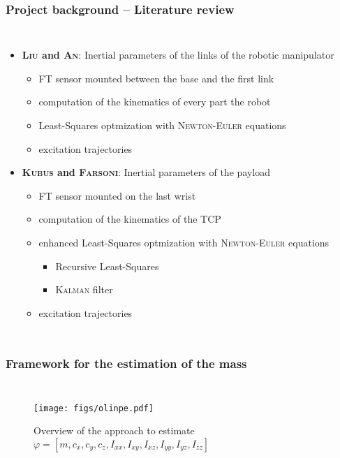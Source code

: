 \documentclass[aspectratio=1610]{beamer}
\begin{document}
\begin{frame}
\frametitle{Project background – Literature review}
\begin{columns}
\column{37em}
\begin{itemize}\itemsep1em
  \justifying
  \item \textbf{\textcolor{TextGreen}{\textsc{Liu} and \textsc{An}}}: Inertial parameters of the links of the robotic manipulator
  \begin{itemize}
    \item \textcolor{Ocean}{FT sensor} mounted between the base and the first link \textcolor{darkred}{\XSolidBrush}
    \item computation of the \textcolor{Ocean}{kinematics} of every part the robot
    \item \textcolor{Ocean}{Least-Squares} optmization with \textcolor{Ocean}{\textsc{Newton-Euler} equations}
    \item \textcolor{Ocean}{excitation trajectories} \textcolor{darkred}{\XSolidBrush}
  \end{itemize}
  \item \textbf{\textcolor{TextGreen}{\textsc{Kubus} and \textsc{Farsoni}}}: Inertial parameters of the payload
  \begin{itemize}
    \item \textcolor{Ocean}{FT sensor} mounted on the last wrist \textcolor{TextGreen}{\CheckmarkBold}
    \item computation of the \textcolor{Ocean}{kinematics} of the TCP
    \item enhanced \textcolor{Ocean}{Least-Squares} optmization with \textcolor{Ocean}{\textsc{Newton-Euler} equations}
    \begin{itemize}
      \item Recursive Least-Squares
      \item \textsc{Kalman} filter
    \end{itemize}
    \item \textcolor{Ocean}{excitation trajectories} \textcolor{darkred}{\XSolidBrush}
  \end{itemize}
\end{itemize}

\end{columns}
\end{frame}

\begin{frame}
\frametitle{Framework for the estimation of the mass}
\begin{columns}
\column{37em}
\begin{figure}
  \centering
  \texttt{[image: figs/olinpe.pdf]}
  \caption{Overview of the approach to estimate $\varphi = [ m, c_{x}, c_{y}, c_{z}, I_{xx}, I_{xy}, I_{xz}, I_{yy}, I_{yz}, I_{zz} ]$}
\end{figure}\end{columns}
\end{frame}
\end{document}

